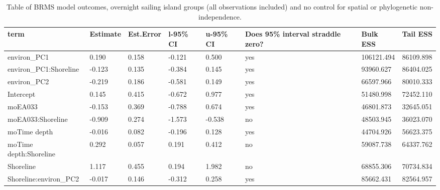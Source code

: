 \begin{table}[ht]
\centering
\begin{tabular}{p{5cm}p{2cm}p{2cm}p{2cm}p{2cm}p{2cm}p{2cm}p{2cm}}
  \toprule
term & Estimate & Est.Error & l-95\% CI & u-95\% CI & Does 95\% interval straddle zero? & Bulk ESS & Tail ESS \\ 
  \midrule
environ\_PC1 & 0.190 & 0.158 & -0.121 & 0.500 & yes & 106121.494 & 86109.898 \\ 
  environ\_PC1:Shoreline & -0.123 & 0.135 & -0.384 & 0.145 & yes & 93960.627 & 86404.025 \\ 
  environ\_PC2 & -0.219 & 0.186 & -0.581 & 0.149 & yes & 66597.966 & 80010.333 \\ 
  Intercept & 0.145 & 0.415 & -0.672 & 0.977 & yes & 51480.998 & 72452.110 \\ 
  moEA033 & -0.153 & 0.369 & -0.788 & 0.674 & yes & 46801.873 & 32645.051 \\ 
  moEA033:Shoreline & -0.909 & 0.274 & -1.573 & -0.538 & no & 48503.945 & 36023.070 \\ 
  moTime depth & -0.016 & 0.082 & -0.196 & 0.128 & yes & 44704.926 & 56623.375 \\ 
  moTime depth:Shoreline & 0.292 & 0.057 & 0.191 & 0.412 & no & 59087.738 & 64337.762 \\ 
  Shoreline & 1.117 & 0.455 & 0.194 & 1.982 & no & 68855.306 & 70734.834 \\ 
  Shoreline:environ\_PC2 & -0.017 & 0.146 & -0.312 & 0.258 & yes & 85662.431 & 82564.957 \\ 
   \bottomrule
\end{tabular}
\caption{Table of BRMS model outcomes, overnight sailing island groups (all observations included) and no control for spatial or phylogenetic non-independence.} 
\label{BRMS_effects_SBZR_control_none}
\end{table}
